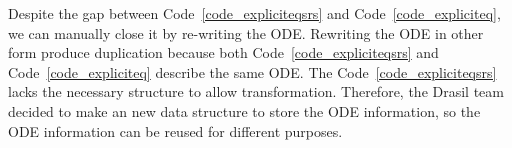 Despite the gap between Code~\ref{code_expliciteqsrs} and Code~\ref{code_expliciteq}, we can manually close it by re-writing the ODE. Rewriting the ODE in other form produce duplication because both Code~\ref{code_expliciteqsrs} and Code~\ref{code_expliciteq} describe the same ODE. The Code~\ref{code_expliciteqsrs} lacks the necessary structure to allow transformation. Therefore, the Drasil team decided to make an new data structure to store the ODE information, so the ODE information can be reused for different purposes.



